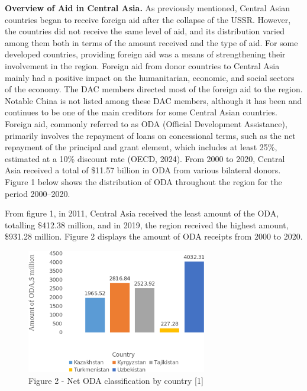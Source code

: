 \begin{multicols}{2}
{\bfseries Overview of Aid in Central Asia}{\bfseries .} As previously
mentioned, Central Asian countries began to receive foreign aid after
the collapse of the USSR. However, the countries did not receive the
same level of aid, and its distribution varied among them both in terms
of the amount received and the type of aid. For some developed
countries, providing foreign aid was a means of strengthening their
involvement in the region. Foreign aid from donor countries to Central
Asia mainly had a positive impact on the humanitarian, economic, and
social sectors of the economy. The DAC members directed most of the
foreign aid to the region. Notable China is not listed among these DAC
members, although it has been and continues to be one of the main
creditors for some Central Asian countries. Foreign aid, commonly
referred to as ODA (Official Development Assistance), primarily involves
the repayment of loans on concessional terms, such as the net repayment
of the principal and grant element, which includes at least 25\%,
estimated at a 10\% discount rate (OECD, 2024). From 2000 to 2020,
Central Asia received a total of \$11.57 billion in ODA from various
bilateral donors. Figure 1 below shows the distribution of ODA
throughout the region for the period 2000--2020.

From figure 1, in 2011, Central Asia received the least amount of the
ODA, totalling \$412.38 million, and in 2019, the region received the
highest amount, \$931.28 million. Figure 2 displays the amount of ODA
receipts from 2000 to 2020.
\end{multicols}

\begin{figure}[H]
	\centering
	\includegraphics[width=0.7\textwidth]{assets/341.1}
	\caption*{Figure 2 - Net ODA classification by country {[}1{]}}
\end{figure}

